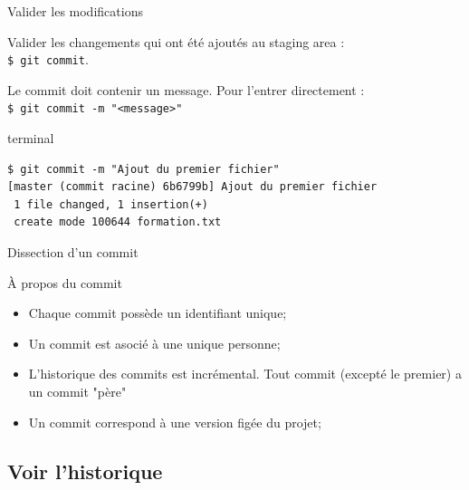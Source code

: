 \documentclass[usepdftitle=false]{beamer}
\def\seplength{.3\topsep}
\begin{document}
\begin{frame}[fragile]{Valider les modifications}

Valider les changements qui ont été ajoutés au staging area :\\
\verb+$ git commit+.

\medskip

Le commit doit contenir un message. Pour l'entrer directement : \\
\verb+$ git commit -m "<message>"+ \\

\bigskip

\begin{beamercolorbox}[rounded=true,shadow=true]{terminal}
\vspace{-\seplength}
\begin{Verbatim}
$ git commit -m "Ajout du premier fichier"
[master (commit racine) 6b6799b] Ajout du premier fichier
 1 file changed, 1 insertion(+)
 create mode 100644 formation.txt
\end{Verbatim}
\end{beamercolorbox}


\end{frame}

\begin{frame}{Dissection d'un commit}
	\begin{block}{À propos du commit}
		\begin{itemize}
			\item Chaque commit possède un identifiant unique;
			\item Un commit est asocié à une unique personne;
			\item L'historique des commits est incrémental. Tout commit (excepté le premier) a un commit "père"
			\item Un commit correspond à une version figée du projet;
		\end{itemize}
	\end{block}
\end{frame}

\subsection{Voir l'historique}
\end{document}
